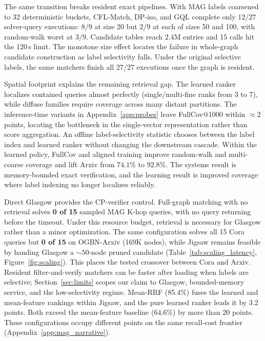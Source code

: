 \documentclass{article}
\begin{document}
The same transition breaks resident exact pipelines. With MAG labels coarsened to 32 deterministic buckets, CFL-Match, DP-iso, and GQL complete only $12/27$ solver-query executions: $8/9$ at size 20 but $2/9$ at each of sizes 50 and 100, with random-walk worst at $3/9$. Candidate tables reach $2.4$M entries and 15 calls hit the 120\,s limit. The monotone size effect locates the failure in whole-graph candidate construction as label selectivity falls. Under the original selective labels, the same matchers finish all $27/27$ executions once the graph is resident.

Spatial footprint explains the remaining retrieval gap. The learned ranker localizes contained queries almost perfectly (single/multi-fine ranks from $3$ to $7$), while diffuse families require coverage across many distant partitions. The inference-time variants in Appendix~\ref{app:probes} leave FullCov@1000 within ${\approx}2$ points, locating the bottleneck in the single-vector representation rather than score aggregation. An offline label-selectivity statistic chooses between the label index and learned ranker without changing the downstream cascade. Within the learned policy, FullCov and aligned training improve random-walk and multi-coarse coverage and lift Arxiv from $74.1\%$ to $92.8\%$. The systems result is memory-bounded exact verification, and the learning result is improved coverage where label indexing no longer localizes reliably.

Direct Glasgow provides the CP-verifier control. Full-graph matching with no retrieval solves \textbf{0 of 15} sampled MAG K-hop queries, with no query returning before the timeout. Under this resource budget, retrieval is necessary for Glasgow rather than a minor optimization. The same configuration solves all 15 Cora queries but \textbf{0 of 15} on OGBN-Arxiv (169K nodes), while Jigsaw remains feasible by handing Glasgow a $\sim\!50$-node pruned candidate (Table~\ref{tab:scaling_latency}, Figure~\ref{fig:scaling}). This places the tested crossover between Cora and Arxiv. Resident filter-and-verify matchers can be faster after loading when labels are selective; Section~\ref{sec:limits} scopes our claim to Glasgow, bounded-memory service, and the low-selectivity regime. Mean-RRF (85.4\%) fuses the learned and mean-feature rankings within Jigsaw, and the pure learned ranker leads it by $3.2$ points. Both exceed the mean-feature baseline ($64.6\%$) by more than 20 points. These configurations occupy different points on the same recall-cost frontier (Appendix~\ref{app:mag_narrative}).
\end{document}
